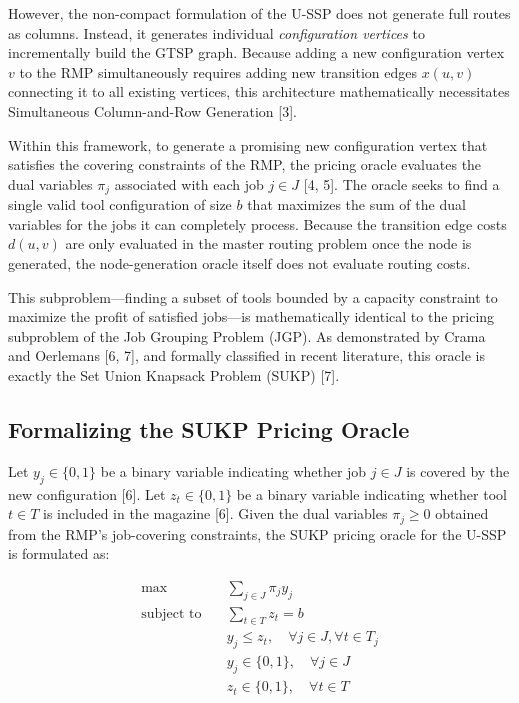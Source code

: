 \documentclass[12pt]{article}
\begin{document}
However, the non-compact formulation of the U-SSP does not generate full routes as columns. Instead, it generates individual \textit{configuration vertices} to incrementally build the GTSP graph. Because adding a new configuration vertex $v$ to the RMP simultaneously requires adding new transition edges $x(u,v)$ connecting it to all existing vertices, this architecture mathematically necessitates Simultaneous Column-and-Row Generation \cite{Muter2013} [3].

Within this framework, to generate a promising new configuration vertex that satisfies the covering constraints of the RMP, the pricing oracle evaluates the dual variables $\pi_j$ associated with each job $j \in J$ [4, 5]. The oracle seeks to find a single valid tool configuration of size $b$ that maximizes the sum of the dual variables for the jobs it can completely process. Because the transition edge costs $d(u,v)$ are only evaluated in the master routing problem once the node is generated, the node-generation oracle itself does not evaluate routing costs.

This subproblem—finding a subset of tools bounded by a capacity constraint to maximize the profit of satisfied jobs—is mathematically identical to the pricing subproblem of the Job Grouping Problem (JGP). As demonstrated by Crama and Oerlemans \cite{Crama1994} [6, 7], and formally classified in recent literature, this oracle is exactly the Set Union Knapsack Problem (SUKP) \cite{Goldschmidt1994} [7].

\subsection{Formalizing the SUKP Pricing Oracle}

Let $y_j \in \{0,1\}$ be a binary variable indicating whether job $j \in J$ is covered by the new configuration [6]. Let $z_t \in \{0,1\}$ be a binary variable indicating whether tool $t \in T$ is included in the magazine [6]. Given the dual variables $\pi_j \ge 0$ obtained from the RMP's job-covering constraints, the SUKP pricing oracle for the U-SSP is formulated as:

\begin{align}
	\max \quad & \sum_{j \in J} \pi_j y_j \label{eq:sukp_obj} \\
	\text{subject to} \quad & \sum_{t \in T} z_t = b \label{eq:sukp_cap} \\
	& y_j \le z_t, \quad \forall j \in J, \forall t \in T_j \label{eq:sukp_link} \\
	& y_j \in \{0,1\}, \quad \forall j \in J \label{eq:sukp_y} \\
	& z_t \in \{0,1\}, \quad \forall t \in T \label{eq:sukp_z}
\end{align}
\end{document}
